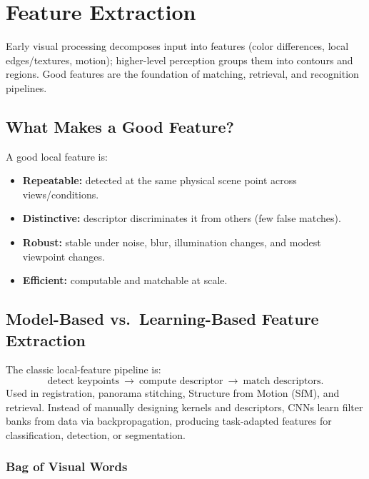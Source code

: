 \documentclass[11pt, oneside]{book}
\begin{document}
\chapter{Feature Extraction}

Early visual processing decomposes input into features (color differences, local edges/textures, motion);
higher-level perception groups them into contours and regions. Good features are the foundation of
matching, retrieval, and recognition pipelines.

\section{What Makes a Good Feature?}

\begin{defbox}[title={Properties of Good Local Features}]
A good local feature is:
\begin{itemize}
  \item \textbf{Repeatable:} detected at the same physical scene point across views/conditions.
  \item \textbf{Distinctive:} descriptor discriminates it from others (few false matches).
  \item \textbf{Robust:} stable under noise, blur, illumination changes, and modest viewpoint changes.
  \item \textbf{Efficient:} computable and matchable at scale.
\end{itemize}
\end{defbox}

\section{Model-Based vs.\ Learning-Based Feature Extraction}

The classic local-feature pipeline is:
\[
\text{detect keypoints} \ \rightarrow\ \text{compute descriptor}\ \rightarrow\ \text{match descriptors}.
\]
Used in registration, panorama stitching, Structure from Motion (SfM), and retrieval.
Instead of manually designing kernels and descriptors, CNNs learn filter banks from data via backpropagation,
producing task-adapted features for classification, detection, or segmentation.

\subsection{Bag of Visual Words}
\end{document}
